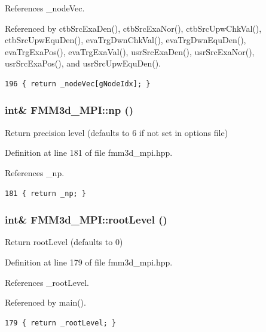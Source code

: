 References \_\-node\-Vec.

Referenced by ctb\-Src\-Exa\-Den(), ctb\-Src\-Exa\-Nor(), ctb\-Src\-Upw\-Chk\-Val(), ctb\-Src\-Upw\-Equ\-Den(), eva\-Trg\-Dwn\-Chk\-Val(), eva\-Trg\-Dwn\-Equ\-Den(), eva\-Trg\-Exa\-Pos(), eva\-Trg\-Exa\-Val(), usr\-Src\-Exa\-Den(), usr\-Src\-Exa\-Nor(), usr\-Src\-Exa\-Pos(), and usr\-Src\-Upw\-Equ\-Den().

\footnotesize\begin{verbatim}196 { return _nodeVec[gNodeIdx]; }
\end{verbatim}\normalsize 


\subsubsection{\setlength{\rightskip}{0pt plus 5cm}int\& FMM3d\_\-MPI::np ()\hspace{0.3cm}{\tt  [inline]}}\label{classFMM3d__MPI_79545716c1fbc95cbd811a65ffa9f767_79545716c1fbc95cbd811a65ffa9f767}


Return precision level (defaults to 6 if not set in options file) 

Definition at line 181 of file fmm3d\_\-mpi.hpp.

References \_\-np.

\footnotesize\begin{verbatim}181 { return _np; }
\end{verbatim}\normalsize 


\subsubsection{\setlength{\rightskip}{0pt plus 5cm}int\& FMM3d\_\-MPI::root\-Level ()\hspace{0.3cm}{\tt  [inline]}}\label{classFMM3d__MPI_f80fcb36cb42936f1912fe8c85ec96e4_f80fcb36cb42936f1912fe8c85ec96e4}


Return root\-Level (defaults to 0) 

Definition at line 179 of file fmm3d\_\-mpi.hpp.

References \_\-root\-Level.

Referenced by main().

\footnotesize\begin{verbatim}179 { return _rootLevel; }
\end{verbatim}\normalsize 


